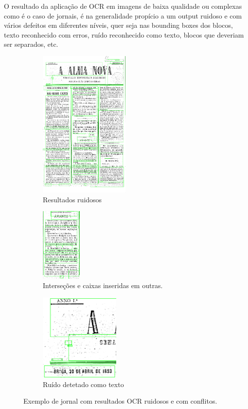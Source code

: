 O resultado da aplicação de OCR em imagens de baixa qualidade ou complexas como é o caso de jornais, é na generalidade propício a um output ruidoso e com vários defeitos em diferentes níveis, quer seja nas bounding boxes dos blocos, texto reconhecido com erros, ruído reconhecido como texto, blocos que deveriam ser separados, etc. 



\begin{figure}[H]
	\centering
	\begin{subfigure}{.5\textwidth}
		\centering
		\includegraphics[width=4.5cm]{images/ilustracoes/noisy_ocr_results.png}
		\caption{Resultados ruidosos}
		\label{fig:noisy_image}
	\end{subfigure}%

	\begin{subfigure}{.5\textwidth}
		\centering
		\includegraphics[width=2cm]{images/ilustracoes/noisy_ocr_results_intersections.png}
		\caption{Interseções e caixas inseridas em outras.}
		\label{fig:noisy_image_intersections}
	\end{subfigure}%
	\begin{subfigure}{.5\textwidth}
		\centering
		\includegraphics[width=4cm]{images/ilustracoes/noisy_ocr_results_noise.png}
		\caption{Ruído detetado como texto}
		\label{fig:noisy_image_noise}
	\end{subfigure}
	\caption{Exemplo de jornal com resultados OCR ruidosos e com conflitos.}
	\label{fig:fig}
\end{figure}



